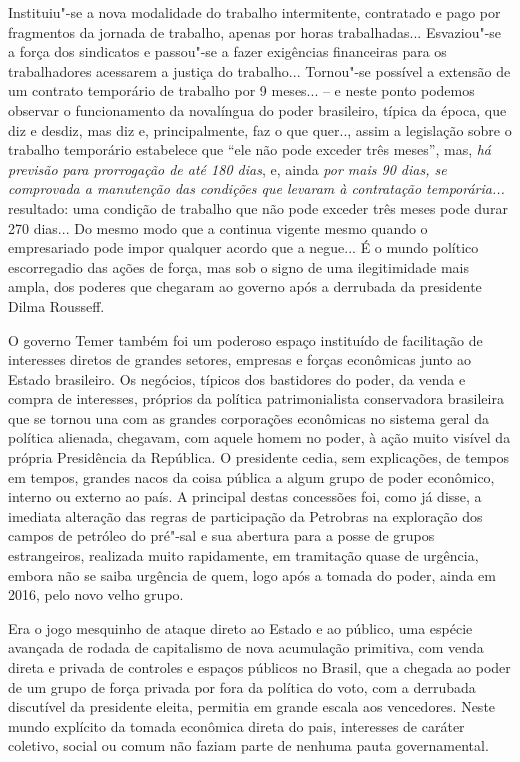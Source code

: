 Instituiu"-se a nova modalidade do trabalho intermitente, contratado e
pago por fragmentos da jornada de trabalho, apenas por horas
trabalhadas... Esvaziou"-se a força dos sindicatos e passou"-se a fazer
exigências financeiras para os trabalhadores acessarem a justiça
do trabalho... Tornou"-se possível a extensão de um contrato temporário
de trabalho por 9 meses... -- e neste ponto podemos observar o
funcionamento da novalíngua do poder brasileiro, típica da época, que
diz e desdiz, mas diz e, principalmente, faz o que quer..,
assim a legislação sobre o trabalho temporário estabelece que ``ele não
pode exceder três meses'', mas, \emph{há previsão para prorrogação de
até 180 dias}, e, ainda \emph{por mais 90 dias, se comprovada a
manutenção das condições que levaram à contratação temporária...}
resultado: uma condição de trabalho que não pode exceder três meses pode
durar 270 dias... Do mesmo modo que a  continua vigente mesmo quando
o empresariado pode impor qualquer acordo que a negue... É o mundo
político escorregadio das ações de força, mas sob o signo de uma
ilegitimidade mais ampla, dos poderes que chegaram ao governo
após a derrubada da presidente Dilma Rousseff.

O governo Temer também foi um poderoso espaço instituído de facilitação
de interesses diretos de grandes setores, empresas e forças econômicas
junto ao Estado brasileiro. Os negócios, típicos dos bastidores do
poder, da venda e compra de interesses, próprios da política
patrimonialista conservadora brasileira que se tornou una com as grandes
corporações econômicas no sistema geral da política alienada,
chegavam, com aquele homem no poder, à ação muito visível da própria
Presidência da República. O presidente cedia, sem explicações,
de tempos em tempos, grandes nacos da coisa pública a algum grupo de
poder econômico, interno ou externo ao país. A principal destas
concessões foi, como já disse, a imediata alteração das regras de
participação da Petrobras na exploração dos campos de petróleo do
pré"-sal e sua abertura para a posse de grupos estrangeiros, realizada
muito rapidamente, em tramitação quase de urgência, embora não se saiba
urgência de quem, logo após a tomada do poder, ainda em 2016, pelo novo velho
grupo.

Era o jogo mesquinho de ataque direto ao Estado e ao público, uma
espécie avançada de rodada de capitalismo de nova acumulação primitiva,
com venda direta e privada de controles e espaços públicos no Brasil,
que a chegada ao poder de um grupo de força privada por fora da política
do voto, com a derrubada discutível da presidente eleita, permitia em
grande escala aos vencedores. Neste mundo explícito da
tomada econômica direta do pais, interesses de caráter coletivo,
social ou comum não faziam parte de nenhuma pauta
governamental.

